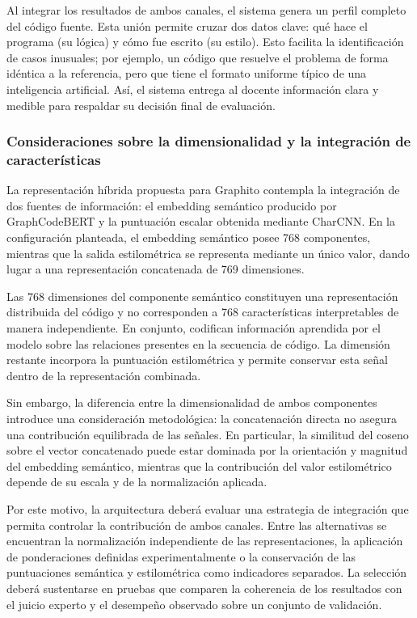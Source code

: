Al integrar los resultados de ambos canales, el sistema genera un perfil completo del código fuente. Esta unión permite cruzar dos datos clave: qué hace el programa (su lógica) y cómo fue escrito (su estilo). Esto facilita la identificación de casos inusuales; por ejemplo, un código que resuelve el problema de forma idéntica a la referencia, pero que tiene el formato uniforme típico de una inteligencia artificial. Así, el sistema entrega al docente información clara y medible para respaldar su decisión final de evaluación.

\subsubsection{Consideraciones sobre la dimensionalidad y la integración de características}

La representación híbrida propuesta para Graphito contempla la integración de dos fuentes de información: el embedding semántico producido por GraphCodeBERT y la puntuación escalar obtenida mediante CharCNN. En la configuración planteada, el embedding semántico posee 768 componentes, mientras que la salida estilométrica se representa mediante un único valor, dando lugar a una representación concatenada de 769 dimensiones.

Las 768 dimensiones del componente semántico constituyen una representación distribuida del código y no corresponden a 768 características interpretables de manera independiente. En conjunto, codifican información aprendida por el modelo sobre las relaciones presentes en la secuencia de código. La dimensión restante incorpora la puntuación estilométrica y permite conservar esta señal dentro de la representación combinada.

Sin embargo, la diferencia entre la dimensionalidad de ambos componentes introduce una consideración metodológica: la concatenación directa no asegura una contribución equilibrada de las señales. En particular, la similitud del coseno sobre el vector concatenado puede estar dominada por la orientación y magnitud del embedding semántico, mientras que la contribución del valor estilométrico depende de su escala y de la normalización aplicada.

Por este motivo, la arquitectura deberá evaluar una estrategia de integración que permita controlar la contribución de ambos canales. Entre las alternativas se encuentran la normalización independiente de las representaciones, la aplicación de ponderaciones definidas experimentalmente o la conservación de las puntuaciones semántica y estilométrica como indicadores separados. La selección deberá sustentarse en pruebas que comparen la coherencia de los resultados con el juicio experto y el desempeño observado sobre un conjunto de validación.

